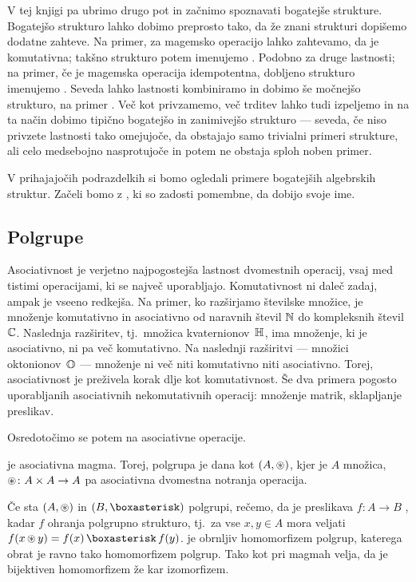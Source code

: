 V tej knjigi pa ubrimo drugo pot in začnimo spoznavati bogatejše strukture. Bogatejšo strukturo lahko dobimo preprosto tako, da že znani strukturi dopišemo dodatne zahteve. Na primer, za magemsko operacijo lahko zahtevamo, da je komutativna; takšno strukturo potem imenujemo . Podobno za druge lastnosti; na primer, če je magemska operacija idempotentna, dobljeno strukturo imenujemo . Seveda lahko lastnosti kombiniramo in dobimo še močnejšo strukturo, na primer . Več kot privzamemo, več trditev lahko tudi izpeljemo in na ta način dobimo tipično bogatejšo in zanimivejšo strukturo --- seveda, če niso privzete lastnosti tako omejujoče, da obstajajo samo trivialni primeri strukture, ali celo medsebojno nasprotujoče in potem ne obstaja sploh noben primer.

V prihajajočih podrazdelkih si bomo ogledali primere bogatejših algebrskih struktur. Začeli bomo z , ki so zadosti pomembne, da dobijo svoje ime.

\subsection{Polgrupe}

Asociativnost je verjetno najpogostejša lastnost dvomestnih operacij, vsaj med tistimi operacijami, ki se največ uporabljajo. Komutativnost ni daleč zadaj, ampak je vseeno redkejša. Na primer, ko razširjamo številske množice, je množenje komutativno in asociativno od naravnih števil $\mathbb{N}$ do kompleksnih števil $\mathbb{C}$. Naslednja razširitev, tj.~množica kvaternionov~$\mathbb{H}$, ima množenje, ki je asociativno, ni pa več komutativno. Na naslednji razširitvi --- množici oktonionov~$\mathbb{O}$ --- množenje ni več niti komutativno niti asociativno. Torej, asociativnost je preživela korak dlje kot komutativnost. Še dva primera pogosto uporabljanih asociativnih nekomutativnih operacij: množenje matrik, sklapljanje preslikav.

Osredotočimo se potem na asociativne operacije.

\begin{definicija}
 je asociativna magma. Torej, polgrupa je dana kot $(A, \mathop{\circledast}\nolimits)$, kjer je $A$ množica, $\mathop{\circledast}\nolimits\colon A \times A \to A$ pa asociativna dvomestna notranja operacija.
\end{definicija}

Če sta $(A, \mathop{\circledast}\nolimits)$ in $(B, \soper)$ polgrupi, rečemo, da je preslikava $f\colon A \to B$ , kadar $f$ ohranja polgrupno strukturo, tj.~za vse $x, y \in A$ mora veljati $f(x \oper y) = f(x) \soper f(y)$.  je obrnljiv homomorfizem polgrup, katerega obrat je ravno tako homomorfizem polgrup. Tako kot pri magmah velja, da je bijektiven homomorfizem že kar izomorfizem.


